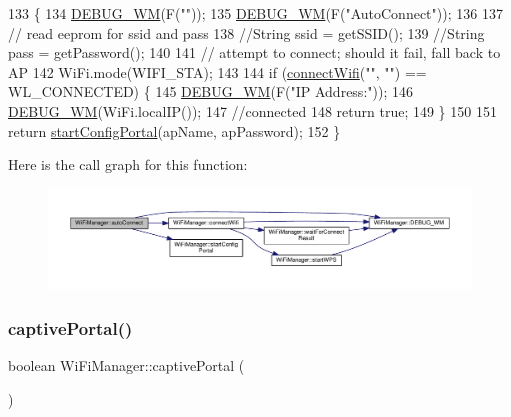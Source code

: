 \begin{DoxyCode}
133                                                                            \{
134   \hyperlink{class_wi_fi_manager_ae5f595c670ccbcf9a191baf50f5c7c26}{DEBUG\_WM}(F(\textcolor{stringliteral}{""}));
135   \hyperlink{class_wi_fi_manager_ae5f595c670ccbcf9a191baf50f5c7c26}{DEBUG\_WM}(F(\textcolor{stringliteral}{"AutoConnect"}));
136 
137   \textcolor{comment}{// read eeprom for ssid and pass}
138   \textcolor{comment}{//String ssid = getSSID();}
139   \textcolor{comment}{//String pass = getPassword();}
140 
141   \textcolor{comment}{// attempt to connect; should it fail, fall back to AP}
142   WiFi.mode(WIFI\_STA);
143 
144   \textcolor{keywordflow}{if} (\hyperlink{class_wi_fi_manager_ae0ae27b5543b47585728c084c3bbdca7}{connectWifi}(\textcolor{stringliteral}{""}, \textcolor{stringliteral}{""}) == WL\_CONNECTED)   \{
145     \hyperlink{class_wi_fi_manager_ae5f595c670ccbcf9a191baf50f5c7c26}{DEBUG\_WM}(F(\textcolor{stringliteral}{"IP Address:"}));
146     \hyperlink{class_wi_fi_manager_ae5f595c670ccbcf9a191baf50f5c7c26}{DEBUG\_WM}(WiFi.localIP());
147     \textcolor{comment}{//connected}
148     \textcolor{keywordflow}{return} \textcolor{keyword}{true};
149   \}
150 
151   \textcolor{keywordflow}{return} \hyperlink{class_wi_fi_manager_ad781751307f7f623956126096a09a545}{startConfigPortal}(apName, apPassword);
152 \}
\end{DoxyCode}
Here is the call graph for this function\+:\nopagebreak
\begin{figure}[H]
\begin{center}
\leavevmode
\includegraphics[width=350pt]{d4/dc8/class_wi_fi_manager_ab1d094034e5e3e36e2e1b3624edad469_cgraph}
\end{center}
\end{figure}
\mbox{\label{class_wi_fi_manager_a4ef4298deb224212e5242c456669a973}} 
\subsubsection{\texorpdfstring{captive\+Portal()}{captivePortal()}}
{\footnotesize\ttfamily boolean Wi\+Fi\+Manager\+::captive\+Portal (\begin{DoxyParamCaption}{ }\end{DoxyParamCaption})\hspace{0.3cm}{\ttfamily [private]}}

